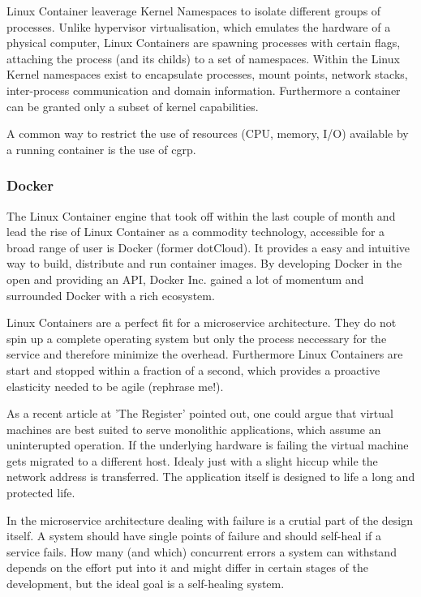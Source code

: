 Linux Container leaverage Kernel Namespaces to isolate different groups of processes. Unlike hypervisor virtualisation, which emulates
the hardware of a physical computer, Linux Containers are spawning processes with certain flags, attaching the process (and its childs)
to a set of namespaces. Within the Linux Kernel namespaces exist to encapsulate processes, mount points, network stacks,
inter-process communication and domain information. Furthermore a container can be granted only a subset of kernel capabilities.

A common way to restrict the use of resources (CPU, memory, I/O) available by a running container is the use of \gls{cgrp}.

\subsubsection{Docker}
The Linux Container engine that took off within the last couple of month and lead the rise of Linux Container as a commodity technology, accessible
for a broad range of user is Docker (former dotCloud). It provides a easy and intuitive way to build, distribute and run container images.
By developing Docker in the open and providing an API, Docker Inc. gained a lot of momentum and surrounded Docker with a rich ecosystem.

Linux Containers are a perfect fit for a microservice architecture. They do not spin up a complete operating system but only the process
neccessary for the service and therefore minimize the overhead. Furthermore Linux Containers are start and stopped within a
fraction of a second, which provides a proactive elasticity needed to be agile (rephrase me!).

As a recent article at 'The Register' pointed out, one could argue that virtual machines are best suited to serve monolithic applications,
which assume an uninterupted operation. If the underlying hardware is failing the virtual machine gets migrated to a different host. Idealy just
with a slight hiccup while the network address is transferred. The application itself is designed to life a long and protected life.

In the microservice architecture dealing with failure is a crutial part of the design itself. A system should have single points of failure and
should self-heal if a service fails. How many (and which) concurrent errors a system can withstand depends on the effort put into it and might differ
in certain stages of the development, but the ideal goal is a self-healing system.


